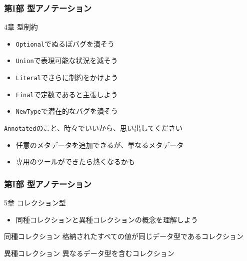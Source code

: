 \documentclass[aspectratio=169,dvipdfmx,14pt,notheorems]{beamer}
\theoremstyle{definition}
\begin{document}
\begin{frame}\frametitle{第I部 型アノテーション}

\begin{block}{4章 型制約}
\begin{itemize}
\item \texttt{Optional}でぬるぽバグを潰そう
\item \texttt{Union}で表現可能な状況を減そう
\item \texttt{Literal}でさらに制約をかけよう
\item \texttt{Final}で定数であると主張しよう
\item \texttt{NewType}で潜在的なバグを潰そう
\end{itemize}

\end{block}

\begin{alertblock}{\texttt{Annotated}のこと、時々でいいから、思い出してください}
\begin{itemize}
\item 任意のメタデータを追加できるが、単なるメタデータ
\item 専用のツールができたら熱くなるかも
\end{itemize}
\end{alertblock}

\end{frame}

\begin{frame}\frametitle{第I部 型アノテーション}

\begin{block}{5章 コレクション型}
\begin{itemize}
\item 同種コレクションと異種コレクションの概念を理解しよう
\end{itemize}
\end{block}

\begin{exampleblock}{同種コレクション}
格納されたすべての値が同じデータ型であるコレクション
\end{exampleblock}

\begin{exampleblock}{異種コレクション}
異なるデータ型を含むコレクション
\end{exampleblock}

\end{frame}
\end{document}
